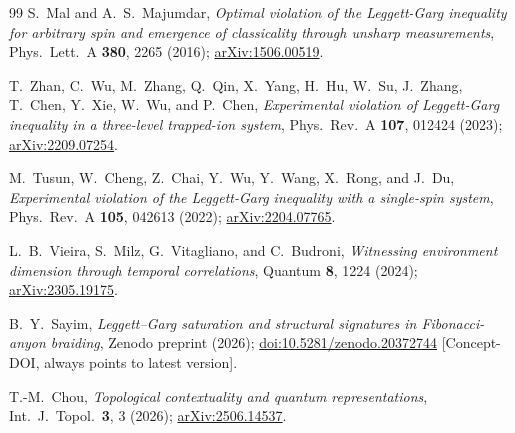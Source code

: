 \documentclass[aps,prx,reprint,amsmath,amssymb,floatfix,nofootinbib,superscriptaddress]{revtex4-2}
\begin{document}
\begin{thebibliography}{99}
S.~Mal and A.~S.~Majumdar,
\emph{Optimal violation of the Leggett-Garg inequality for arbitrary spin and emergence of classicality through unsharp measurements},
Phys.\ Lett.\ A \textbf{380}, 2265 (2016);
\href{https://arxiv.org/abs/1506.00519}{arXiv:1506.00519}.

T.~Zhan, C.~Wu, M.~Zhang, Q.~Qin, X.~Yang, H.~Hu, W.~Su, J.~Zhang, T.~Chen, Y.~Xie, W.~Wu, and P.~Chen,
\emph{Experimental violation of Leggett-Garg inequality in a three-level trapped-ion system},
Phys.\ Rev.\ A \textbf{107}, 012424 (2023);
\href{https://arxiv.org/abs/2209.07254}{arXiv:2209.07254}.

M.~Tusun, W.~Cheng, Z.~Chai, Y.~Wu, Y.~Wang, X.~Rong, and J.~Du,
\emph{Experimental violation of the Leggett-Garg inequality with a single-spin system},
Phys.\ Rev.\ A \textbf{105}, 042613 (2022);
\href{https://arxiv.org/abs/2204.07765}{arXiv:2204.07765}.

L.~B.~Vieira, S.~Milz, G.~Vitagliano, and C.~Budroni,
\emph{Witnessing environment dimension through temporal correlations},
Quantum \textbf{8}, 1224 (2024);
\href{https://arxiv.org/abs/2305.19175}{arXiv:2305.19175}.

B.~Y.~Sayim,
\emph{Leggett--Garg saturation and structural signatures in Fibonacci-anyon braiding},
Zenodo preprint (2026);
\href{https://doi.org/10.5281/zenodo.20372744}{doi:10.5281/zenodo.20372744}
[Concept-DOI, always points to latest version].

T.-M.~Chou,
\emph{Topological contextuality and quantum representations},
Int.\ J.\ Topol.\ \textbf{3}, 3 (2026);
\href{https://arxiv.org/abs/2506.14537}{arXiv:2506.14537}.

\end{thebibliography}
\end{document}

